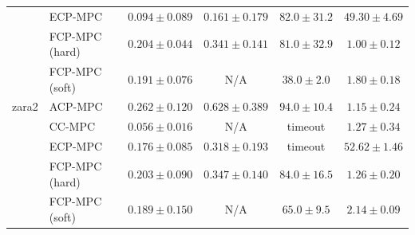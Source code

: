 \begin{tabular}{llcccc}
 & ECP-MPC~\cite{shin2025egocentric} & $0.094\pm0.089$ & $\mathbf{0.161}\pm0.179$ & $82.0\pm31.2$ & $49.30\pm4.69$ \\
 & FCP-MPC (hard) & $0.204\pm0.044$ & $0.341\pm0.141$ & $81.0\pm32.9$ & $1.00\pm0.12$ \\
 & FCP-MPC (soft) & $0.191\pm0.076$ & N/A & $\mathbf{38.0}\pm2.0$ & $1.80\pm0.18$ \\
\hline
zara2 & ACP-MPC~\cite{dixit2023adaptive} & $0.262\pm0.120$ & $0.628\pm0.389$ & $94.0\pm10.4$ & $\mathbf{1.15}\pm0.24$ \\
 & CC-MPC~\cite{lekeufack2024decision} & $\mathbf{0.056}\pm0.016$ & N/A & timeout & $1.27\pm0.34$ \\
 & ECP-MPC~\cite{shin2025egocentric} & $0.176\pm0.085$ & $\mathbf{0.318}\pm0.193$ & timeout & $52.62\pm1.46$ \\
 & FCP-MPC (hard) & $0.203\pm0.090$ & $0.347\pm0.140$ & $84.0\pm16.5$ & $1.26\pm0.20$ \\
 & FCP-MPC (soft) & $0.189\pm0.150$ & N/A & $\mathbf{65.0}\pm9.5$ & $2.14\pm0.09$ \\
\hline
\end{tabular}